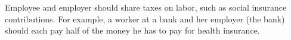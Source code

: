 Employee and employer should share taxes on labor, such as social insurance contributions.
For example, a worker at a bank and her employer (the bank) should each pay half of the money he has to pay for health insurance.